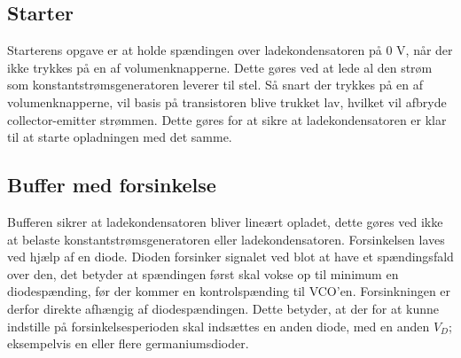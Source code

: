 \subsection{Starter}
\label{volumenkontrol-simulering-starter}

Starterens opgave er at holde spændingen over ladekondensatoren på 0 V, når der ikke trykkes på en af volumenknapperne. Dette gøres ved at lede al den strøm som konstantstrømsgeneratoren leverer til stel. Så snart der trykkes på en af volumenknapperne, vil basis på transistoren blive trukket lav, hvilket vil afbryde collector-emitter strømmen. Dette gøres for at sikre at ladekondensatoren er klar til at starte opladningen med det samme.
\subsection{Buffer med forsinkelse}
\label{volumenkontrol-simulering-buffer}

Bufferen sikrer at ladekondensatoren bliver lineært opladet, dette gøres ved ikke at belaste konstantstrømsgeneratoren eller ladekondensatoren. Forsinkelsen laves ved hjælp af en diode. Dioden forsinker signalet ved blot at have et spændingsfald over den, det betyder at spændingen først skal vokse op til minimum en diodespænding, før der kommer en kontrolspænding til VCO'en. Forsinkningen er derfor direkte afhængig af diodespændingen. Dette betyder, at der for at kunne indstille på forsinkelsesperioden skal indsættes en anden diode, med en anden $V_{D}$; eksempelvis en eller flere germaniumsdioder.

